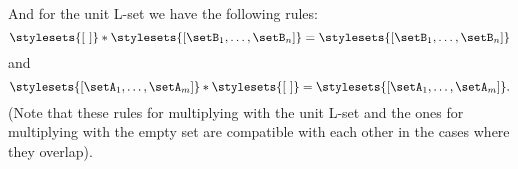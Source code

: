 And for the unit L-set we have the following rules: 
\begin{equation}
\stylesets{[ \ ]} * \stylesets{[\setB_1, \dots, \setB_n]} = \stylesets{[\setB_1,  \dots, \setB_n]}
\end{equation}
and 
\begin{equation}
\stylesets{[\setA_1, \dots, \setA_m]} * \stylesets{[ \ ]} = \stylesets{[\setA_1, \dots, \setA_m]}.
\end{equation}
(Note that these rules for multiplying with the unit L-set and the ones for multiplying with the empty set are compatible with each other in the cases where they overlap). 










